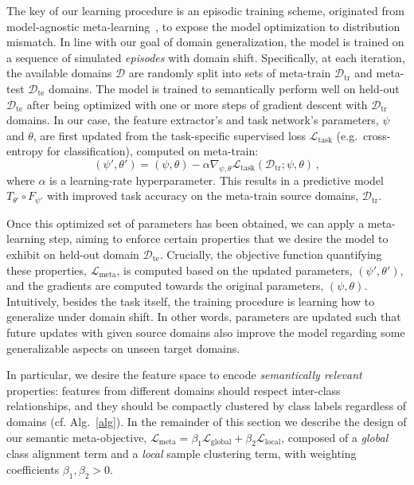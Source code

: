 \documentclass{article}
\newcommand{\Domains}{\mathcal{D}}
\newcommand{\TrainDomains}{\Domains_\mathrm{tr}}
\newcommand{\TestDomains}{\Domains_\mathrm{te}}
\newcommand{\TaskLoss}{\mathcal{L}_\mathrm{task}}
\newcommand{\LabelLoss}{\mathcal{L}_\mathrm{global}}
\newcommand{\MetricLoss}{\mathcal{L}_\mathrm{local}}
\newcommand{\MetaLoss}{\mathcal{L}_\mathrm{meta}}
\newcommand{\grad}[1][]{\nabla_{\!#1}}
\begin{document}
The key of our learning procedure is an episodic training scheme, originated from model-agnostic meta-learning~\citep{finn2017model}, to expose the model optimization to distribution mismatch.
In line with our goal of domain generalization, the model is trained on a sequence of simulated \emph{episodes} with domain shift. 
Specifically, at each iteration, the available domains $\Domains$ are randomly split into sets of meta-train $\TrainDomains$ and meta-test $\TestDomains$ domains.
The model is trained to semantically perform well on held-out $\TestDomains$ after being optimized with one or more steps of gradient descent with $\TrainDomains$ domains.
In our case, the feature extractor's and task network's parameters, $\psi$ and $\theta$, are first updated from the task-specific supervised loss $\TaskLoss$ (e.g.\ cross-entropy for classification), computed on meta-train: 
\begin{equation}
    (\psi',\theta') = (\psi,\theta) - \alpha \grad[\psi,\theta] \TaskLoss(\TrainDomains; \psi,\theta) \,,
\end{equation}
where $\alpha$ is a learning-rate hyperparameter. This results in a predictive model $T_{\theta'} \circ F_{\psi'}$ with improved task accuracy on the meta-train source domains, $\TrainDomains$.

Once this optimized set of parameters has been obtained, we can apply a meta-learning step, aiming to enforce certain properties that we desire the model to exhibit on held-out domain $\TestDomains$. Crucially, the objective function quantifying these properties, $\MetaLoss$, is computed based on the updated parameters, $(\psi',\theta')$, and the gradients are computed towards the original parameters, $(\psi,\theta)$. 
Intuitively, besides the task itself, the training procedure is learning how to generalize under domain shift.
In other words, parameters are updated such that future updates with given source domains also improve the model regarding some generalizable aspects on unseen target domains.

In particular, we desire the feature space to encode \emph{semantically relevant} properties: features from different domains should respect inter-class relationships, and they should be compactly clustered by class labels regardless of domains (cf. Alg.~\ref{alg}). In the remainder of this section we describe the design of our semantic meta-objective, $\MetaLoss = \beta_1 \LabelLoss + \beta_2 \MetricLoss$, composed of a \emph{global} class alignment term and a \emph{local} sample clustering term, with weighting coefficients $\beta_1, \beta_2 > 0$.
\end{document}
